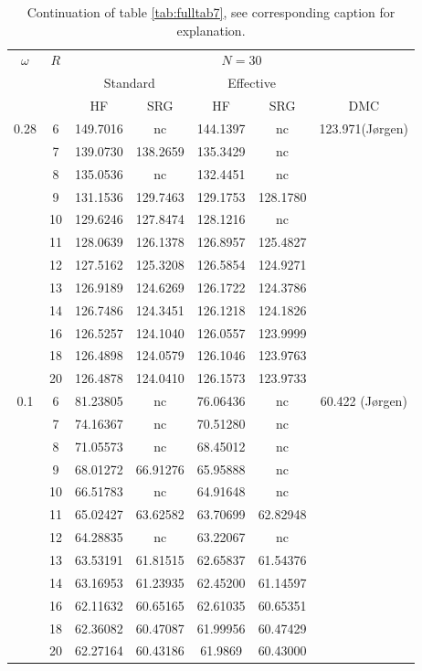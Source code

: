 \begin{table}
\begin{center}
\tabcolsep=0.35cm
\begin{tabular}{|c|c|c|c|c|c|c|}
\hline
\multirow{3}{*}{$\omega$} & \multirow{3}{*}{$R$} & \multicolumn{5}{|c|}{$N=30$} \\
& & \multicolumn{2}{|c|}{Standard} & \multicolumn{2}{|c|}{Effective} &  \\
& & HF & SRG & HF & SRG & DMC \\
\hline\hline
\multirow{11}{*}{0.28} & 6&149.7016 &nc &144.1397 &nc & \multirow{11}{*}{123.971(J{\o}rgen)} \\
& 7&139.0730 &138.2659  &135.3429 &nc & \\
& 8&135.0536 & nc&132.4451 &nc & \\
& 9&131.1536 &129.7463 &129.1753 &128.1780 & \\
& 10&129.6246 &127.8474 &128.1216 & nc& \\
& 11&128.0639 &126.1378 &126.8957 &125.4827 & \\
&12 &127.5162 &125.3208 &126.5854 &124.9271 & \\
&13 &126.9189 &124.6269 &126.1722 &124.3786 & \\
&14 & 126.7486 &124.3451 &126.1218 &124.1826 & \\
&16 &126.5257 &124.1040 &126.0557 &123.9999 & \\
& 18&126.4898 &124.0579 &126.1046 & 123.9763& \\
&20 &126.4878 &124.0410 &126.1573 &123.9733 & \\
\hline
\multirow{11}{*}{0.1} & 6&81.23805 &nc &76.06436 &nc & \multirow{11}{*}{60.422 (J{\o}rgen)} \\
& 7&74.16367 &  nc&70.51280 & nc& \\
& 8&71.05573 &nc & 68.45012&nc & \\
& 9&68.01272 &66.91276 &65.95888 &nc & \\
& 10&66.51783 &nc &64.91648 & nc& \\
& 11&65.02427 & 63.62582&63.70699 & 62.82948& \\
& 12&64.28835 &nc & 63.22067 &nc & \\
& 13 &63.53191 & 61.81515 &62.65837 &61.54376 & \\
&14 &63.16953 &61.23935 &62.45200 &61.14597 & \\
&16 &62.11632 &60.65165 &62.61035 &60.65351 & \\
& 18&62.36082 &60.47087 &61.99956 &60.47429 & \\  
&20 &62.27164 &60.43186 &61.9869 &60.43000 & \\
\hline
\end{tabular}
\end{center}
\caption{Continuation of table \ref{tab:fulltab7}, see corresponding caption for explanation.}
\label{tab:fulltab8}
\end{table}


